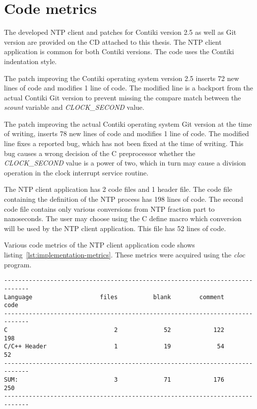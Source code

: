 
\section{Code metrics}
The developed NTP client and patches for Contiki version 2.5
as well as Git version are provided on the CD attached to this thesis.
The NTP client application is common for both Contiki versions.
The code uses the Contiki indentation style.

The patch improving the Contiki operating system version 2.5
inserts 72 new lines of code and modifies 1 line of code.
The modified line is a backport from the actual Contiki Git version to prevent
missing the compare match between the {\it{scount}} variable and {\it{CLOCK\_SECOND}} value.

The patch improving the actual Contiki operating system Git version at the time of writing,
inserts 78 new lines of code and modifies 1 line of code.
The modified line fixes a reported bug, which has not been fixed at the time of writing.
This bug causes a wrong decision of the C preprocessor whether the {\it{CLOCK\_SECOND}}
value is a power of two, which in turn may cause a division operation in
the clock interrupt service routine.

The NTP client application has 2 code files and 1 header file.
The code file containing the definition of the NTP process
has 198 lines of code.
The second code file contains only various conversions from NTP fraction part
to nanoseconds.
The user may choose using the C define macro which conversion will be used
by the NTP client application.
This file has 52 lines of code.

Various code metrics of the NTP client application code
shows listing~\ref{lst:implementation-metrics}.
These metrics were acquired using the {\it{cloc}} program.
\begin{lstlisting}[caption={NTP client application code metrics},label={lst:implementation-metrics}]
-----------------------------------------------------------------------------
Language                   files          blank        comment           code
-----------------------------------------------------------------------------
C                              2             52            122            198
C/C++ Header                   1             19             54             52
-----------------------------------------------------------------------------
SUM:                           3             71            176            250
-----------------------------------------------------------------------------
\end{lstlisting}
